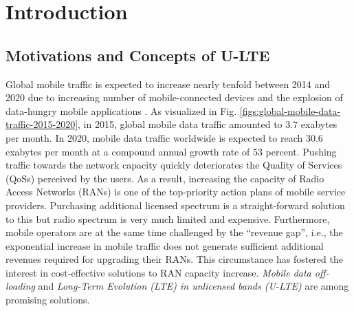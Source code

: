 %
%
%
\chapter{Introduction}
\label{intro} 



\section{Motivations and Concepts of U-LTE}
\label{lte-motiv}

Global mobile traffic is expected to increase nearly tenfold between 2014 and 2020 due to increasing number of mobile-connected devices and the explosion of data-hungry mobile applications \cite{cisco_mobile_traffic_2015}. As visualized in Fig. \ref{figs:global-mobile-data-traffic-2015-2020}, in 2015, global mobile data traffic amounted to $3.7$ exabytes per month. In 2020, mobile data traffic worldwide is expected to reach $30.6$ exabytes per month at a compound annual growth rate of $53$ percent. Pushing traffic towards the network capacity quickly deteriorates the Quality of Services (QoSs) perceived by the users. As a result, increasing the capacity of Radio Access Networks (RANs) is one of the top-priority action plans of mobile service providers. Purchasing additional licensed spectrum is a straight-forward solution to this but radio spectrum is very much limited and expensive. Furthermore, mobile operators are at the same time challenged by the ``revenue gap'', i.e., the exponential increase in mobile traffic does not generate sufficient additional revenues required for upgrading their RANs. This circumstance has fostered the interest in cost-effective solutions to RAN capacity increase. \textit{Mobile data off-loading} and \textit{Long-Term Evolution (LTE) in unlicensed bands (U-LTE)} are among promising solutions. 

